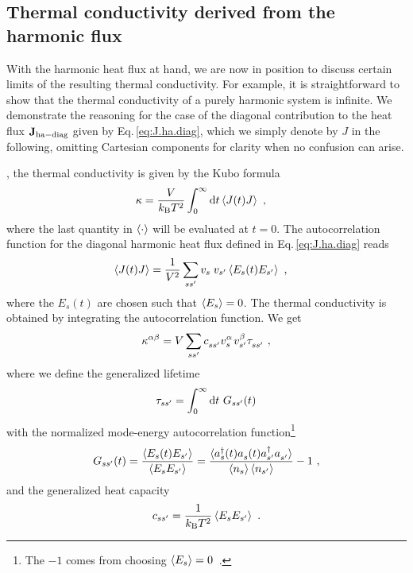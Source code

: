 \subsection{Thermal conductivity derived from the harmonic flux}
{With the harmonic heat flux at hand}, we are now in position to discuss certain limits of the resulting thermal conductivity. For example, it is straightforward to show that the thermal conductivity of a purely harmonic system is infinite. 
We demonstrate the reasoning for the case of the diagonal contribution to the heat flux ${\bf J}_{\rm ha-diag}$ given by Eq.\,\eqref{eq:J.ha.diag}, which we simply denote by $J$ in the following, omitting Cartesian components for clarity when no confusion can arise.

, the thermal conductivity is given by the Kubo formula
\begin{align}
	\kappa
		&=
		\frac{V}{k_{\rm B} T^2} \int_{0}^{\infty} 
		\d t \braket{J (t) J} ~,
	\label{eq:flux.ha.k}
\end{align}
where the last quantity in $\braket{\cdot}$ will be evaluated at $t=0$.
The autocorrelation function for the diagonal harmonic heat flux defined in Eq.\,\eqref{eq:J.ha.diag} reads
\begin{align}
	\braket{J(t) J} 
		&= \frac{1}{V^2} \sum_{ss'} v_{\fP s} v_{s'}
			\braket{E_s (t) E_{s'}}~,
	\label{eq:ha.kappa.dJ.corr}
\end{align}
where the $E_s (t)$ are chosen such that $\braket{E_s} = 0$. The thermal conductivity is obtained by integrating the autocorrelation function. We get
\begin{align}
	\kappa^{\alpha \beta}
		= V \sum_{ss'} \fD c_{ss'} v^\alpha_{\fP s} v^\beta_{s'} \fD \tau_{ss'}~,
	\label{eq:kappa_ss}
\end{align}
where we define the generalized lifetime
\begin{align}
	\tau_{ss'} 
		=	\int_{0}^{\infty} \d t ~ G_{ss'} (t)
	\label{eq:tau_ss}
\end{align}
with the normalized mode-energy autocorrelation function\footnote{The $-1$ comes from choosing $\braket{E_s} =0$~.}
\begin{align}
	G_{ss'} (t)
		= \frac{\braket{E_s (t) E_{s'}}}{\braket{E_s E_{s'}}}
	  = \frac{\braket{\D a_s (t) \fD{a}_s (t) \D a_{s'} \fD a_{s'}}}{\braket{n_s} \braket{n_{s'}}} - 1~,
	\label{eq:G_ss}
\end{align}
and the generalized heat capacity
\begin{align}
	c_{ss'} = \frac{1}{k_{\rm B} T^2} \braket{E_s E_{s'}}~.
	\label{c_ss}
\end{align}

